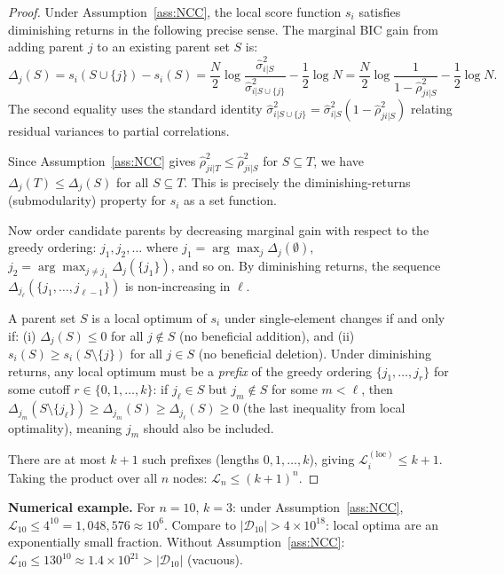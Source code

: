 \documentclass{article}
\theoremstyle{definition}
\theoremstyle{plain}
\theoremstyle{remark}
\begin{document}
\begin{proof}
Under Assumption~\ref{ass:NCC}, the local score function $s_i$ satisfies diminishing
returns in the following precise sense. The marginal BIC gain from adding parent $j$ to
an existing parent set $S$ is:
\begin{equation}
  \Delta_j(S) = s_i(S \cup \{j\}) - s_i(S)
  = \frac{N}{2}\log\frac{\hat{\sigma}^2_{i|S}}{\hat{\sigma}^2_{i|S \cup \{j\}}}
    - \frac{1}{2}\log N
  = \frac{N}{2}\log\frac{1}{1 - \hat{\rho}^2_{ji|S}} - \frac{1}{2}\log N.
\end{equation}
The second equality uses the standard identity
$\hat{\sigma}^2_{i|S \cup \{j\}} = \hat{\sigma}^2_{i|S}(1 - \hat{\rho}^2_{ji|S})$
relating residual variances to partial correlations.

Since Assumption~\ref{ass:NCC} gives $\hat{\rho}^2_{ji|T} \leq \hat{\rho}^2_{ji|S}$ for
$S \subseteq T$, we have $\Delta_j(T) \leq \Delta_j(S)$ for all $S \subseteq T$. This is
precisely the diminishing-returns (submodularity) property for $s_i$ as a set function.

Now order candidate parents by decreasing marginal gain with respect to the greedy ordering:
$j_1, j_2, \ldots$ where $j_1 = \arg\max_j \Delta_j(\emptyset)$,
$j_2 = \arg\max_{j \neq j_1} \Delta_j(\{j_1\})$, and so on. By diminishing returns,
the sequence $\Delta_{j_\ell}(\{j_1, \ldots, j_{\ell-1}\})$ is non-increasing in $\ell$.

A parent set $S$ is a local optimum of $s_i$ under single-element changes if and only if:
(i) $\Delta_j(S) \leq 0$ for all $j \notin S$ (no beneficial addition), and
(ii) $s_i(S) \geq s_i(S \setminus \{j\})$ for all $j \in S$ (no beneficial deletion).
Under diminishing returns, any local optimum must be a \emph{prefix} of the greedy ordering
$\{j_1, \ldots, j_r\}$ for some cutoff $r \in \{0, 1, \ldots, k\}$: if $j_\ell \in S$ but
$j_m \notin S$ for some $m < \ell$, then $\Delta_{j_m}(S \setminus \{j_\ell\}) \geq
\Delta_{j_m}(S) \geq \Delta_{j_\ell}(S) \geq 0$ (the last inequality from local
optimality), meaning $j_m$ should also be included.

There are at most $k + 1$ such prefixes (lengths $0, 1, \ldots, k$), giving
$\mathcal{L}_i^{(\mathrm{loc})} \leq k + 1$. Taking the product over all $n$ nodes:
$\mathcal{L}_n \leq (k+1)^n$.
\end{proof}

\textbf{Numerical example.} For $n = 10$, $k = 3$: under Assumption~\ref{ass:NCC},
$\mathcal{L}_{10} \leq 4^{10} = 1{,}048{,}576 \approx 10^6$. Compare to
$|\mathcal{D}_{10}| > 4 \times 10^{18}$: local optima are an exponentially small fraction.
Without Assumption~\ref{ass:NCC}: $\mathcal{L}_{10} \leq 130^{10} \approx 1.4 \times
10^{21} > |\mathcal{D}_{10}|$ (vacuous).
\end{document}
